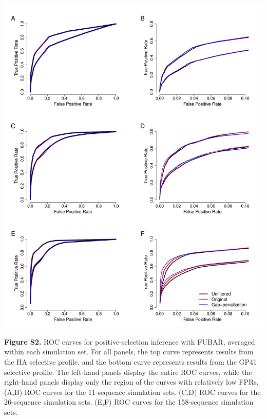 \documentclass[11pt]{article}
\begin{document}
\newpage
\centerline{\includegraphics[width=6.25in]{Figures/ROC_SI_fubar.pdf}}
\noindent \textbf{Figure S2.} ROC curves for positive-selection inference with FUBAR, averaged within each simulation set. For all panels, the top curve represents results from the HA selective profile, and the bottom curve represents results from the GP41 selective profile. The left-hand panels display the entire ROC curves, while the right-hand panels display only the region of the curves with relatively low FPRs.  (A,B) ROC curves for the 11-sequence simulation sets. (C,D) ROC curves for the 26-sequence simulation sets. (E,F) ROC curves for the 158-sequence simulation sets.
\end{document}
